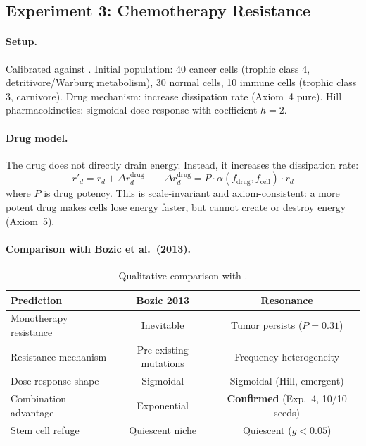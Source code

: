 \documentclass[11pt,a4paper]{article}
\begin{document}
\subsection{Experiment 3: Chemotherapy Resistance}

\paragraph{Setup.}
Calibrated against \citet{bozic2013evolutionary}.
Initial population:
40 cancer cells (trophic class 4, detritivore/Warburg metabolism),
30 normal cells, 10 immune cells (trophic class 3, carnivore).
Drug mechanism: increase dissipation rate (Axiom~4 pure).
Hill pharmacokinetics: sigmoidal dose-response with
coefficient $h = 2$.

\paragraph{Drug model.}
The drug does not directly drain energy. Instead,
it increases the dissipation rate:
\begin{equation}
  r'_d = r_d + \Delta r_d^{\text{drug}}
  \qquad
  \Delta r_d^{\text{drug}} = P \cdot \alpha(f_{\text{drug}}, f_{\text{cell}}) \cdot r_d
  \label{eq:drug}
\end{equation}
where $P$ is drug potency. This is scale-invariant and
axiom-consistent: a more potent drug makes cells lose energy
faster, but cannot create or destroy energy (Axiom~5).

\paragraph{Comparison with Bozic et al.\ (2013).}

\begin{table}[h]
\centering
\caption{Qualitative comparison with \citet{bozic2013evolutionary}.}
\label{tab:bozic-comparison}
\small
\begin{tabular}{@{}lcc@{}}
\toprule
\textbf{Prediction} & \textbf{Bozic 2013} & \textbf{Resonance} \\
\midrule
Monotherapy resistance & Inevitable & Tumor persists ($P = 0.31$) \\
Resistance mechanism & Pre-existing mutations & Frequency heterogeneity \\
Dose-response shape & Sigmoidal & Sigmoidal (Hill, emergent) \\
Combination advantage & Exponential & \textbf{Confirmed} (Exp.~4, 10/10 seeds) \\
Stem cell refuge & Quiescent niche & Quiescent ($g < 0.05$) \\
\bottomrule
\end{tabular}
\end{table}
\end{document}
